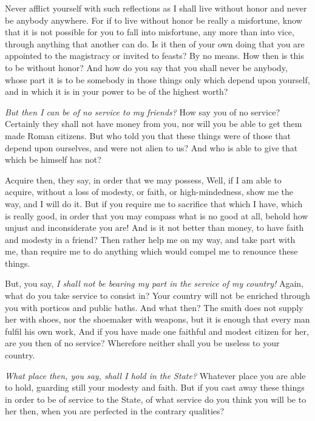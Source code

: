 Never afflict yourself with such reflections  as I shall live without honor and
never be anybody anywhere. For if to live without honor be really a misfortune,
know that  it is not possible  for you to  fall into misfortune, any  more than
into vice, through anything  that another can do. Is it then  of your own doing
that you are appointed to the magistracy or invited to feasts? By no means. How
then is this  to be without honor? And  how do you say that you  shall never be
anybody, whose part it is to be somebody in those things only which depend upon
yourself, and in which it is in your power to be of the highest worth?

\emph{But  then I  can be  of no  service to  my friends?}  How say  you of  no
service? Certainly they shall not have money  from you, nor will you be able to
get them made Roman citizens. But who  told you that these things were of those
that depend upon ourselves,  and were not alien to us? And who  is able to give
that which be himself has not?

Acquire then,  they say, in order  that we may possess,  Well, if I am  able to
acquire, without a  loss of modesty, or faith, or  high-mindedness, show me the
way, and I  will do it. But if  you require me to sacrifice that  which I have,
which is  really good, in order  that you may compass  what is no good  at all,
behold how unjust and  inconsiderate you are! And is it  not better than money,
to have faith and modesty in a friend?  Then rather help me on my way, and take
part with me, than require me to  do anything which would compel me to renounce
these things.

But,  you say,  \emph{I shall  not be  bearing  my part  in the  service of  my
country!} Again, what do you take service  to consist in? Your country will not
be enriched  through you  with porticos  and public baths.  And what  then? The
smith does not supply her with shoes, nor the shoemaker with weapons, but it is
enough that every  man fulfil his own  work, And if you have  made one faithful
and modest citizen for her, are you then of no service? Wherefore neither shall
you be useless to your country.

\emph{What place then, you say, shall I  hold in the State?} Whatever place you
are able to hold,  guarding still your modesty and faith. But  if you cast away
these things  in order to be  of service to the  State, of what service  do you
think  you  will be  to  her  then, when  you  are  perfected in  the  contrary
qualities?
